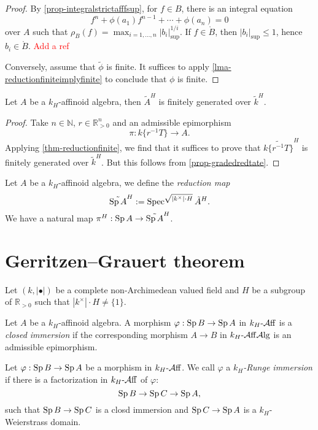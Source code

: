 \begin{proof}
    By \cref{prop-integralstrictafffsup}, for $f\in B$, there is an integral equation 
    \[
        f^n+\phi(a_1)f^{n-1}+\cdots+\phi(a_n)=0
    \]
    over $A$ such that $\rho_B(f)=\max_{i=1,\ldots,n}|b_i|_{\sup}^{1/i}$. If $f\in \mathring{B}$, then $|b_i|_{\sup}\leq 1$, hence $b_i\in \mathring{B}$. \textcolor{red}{Add a ref}

    Conversely, assume that $\tilde{\phi}$ is finite. It suffices to apply \cref{lma-reductionfiniteimplyfinite} to conclude that $\phi$ is finite.
\end{proof}

\begin{corollary}\label{cor-reductionfinitelygenerated}
    Let $A$ be a $k_H$-affinoid algebra, then $\tilde{A}^H$ is finitely generated over $\tilde{k}^H$.
\end{corollary}
\begin{proof}
    Take $n\in \mathbb{N}$, $r\in \mathbb{R}^n_{>0}$ and an admissible epimorphism 
    \[
        \pi:k\{r^{-1}T\}\rightarrow A.    
    \]
    Applying \cref{thm-reductionfinite}, we find that it suffices to prove that $\widetilde{k\{r^{-1}T\}}^H$ is finitely generated over $\tilde{k}^H$. But this follows from \cref{prop-gradedredtate}.
\end{proof}

\begin{definition}
    Let $A$ be a $k_H$-affinoid algebra, we define the \emph{reduction map}
    \[
        \tilde{\operatorname{Sp} A}^H:=\operatorname{Spec}^{\sqrt{|k^{\times}|\cdot H}}\tilde{A}^H.  
    \]
    We have a natural map $\pi^H:\operatorname{Sp} A\rightarrow \tilde{\operatorname{Sp} A}^H$.
\end{definition}

\section{Gerritzen--Grauert theorem}
Let $(k,|\bullet|)$ be a complete non-Archimedean valued field and $H$ be a subgroup of $\mathbb{R}_{>0}$ such that $|k^{\times}|\cdot H\neq \{1\}$.

\begin{definition}\label{def-closedimmersion}
    Let $A$ be a $k_H$-affinoid algebra. A morphism $\varphi:\operatorname{Sp} B\rightarrow \operatorname{Sp} A$ in $k_H\text{-}\mathcal{A}\mathrm{ff}$ is a \emph{closed immersion} if the corresponding morphism $A\rightarrow B$ in $k_H\text{-}\mathcal{A}\mathrm{ff}\mathcal{A}\mathrm{lg}$ is an admissible epimorphism.
\end{definition}


\begin{definition}
    Let $\varphi:\operatorname{Sp} B\rightarrow \operatorname{Sp} A$ be a morphism in $k_H\text{-}\mathcal{A}\mathrm{ff}$. We call $\varphi$ a \emph{$k_H$-Runge immersion} if there is a factorization in $k_H\text{-}\mathcal{A}\mathrm{ff}$ of $\varphi$:
    \[
        \operatorname{Sp} B \rightarrow \operatorname{Sp} C\rightarrow \operatorname{Sp} A,
    \]
    such that $\operatorname{Sp} B\rightarrow \operatorname{Sp} C$ is a closd immersion and $\operatorname{Sp} C\rightarrow \operatorname{Sp} A$ is a $k_H$-Weierstrass domain.
\end{definition}

